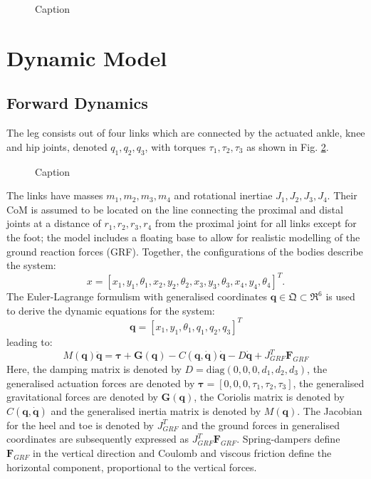 \documentclass[letterpaper, 10 pt, conference]{ieeeconf}  %
\begin{document}
\begin{figure}[b]
	\centering
	\caption{Caption}
	\label{fig:configurations}
\end{figure}

\section{Dynamic Model} \label{sec:dynamicModel}

\subsection{Forward Dynamics} 
The leg consists out of four links which are connected by the actuated ankle, knee and hip joints, denoted $q_1,q_2,q_3$, with torques $\tau_1,\tau_2,\tau_3$ as shown in Fig. \ref{fig:leg}. 
\begin{figure}[b]
	\centering
	\caption{Caption}
	\label{fig:leg}
\end{figure}
The links have masses $m_1,m_2,m_3,m_4$ and rotational inertiae $J_1,J_2,J_3,J_4$. Their CoM is assumed to be located on the line connecting the proximal and distal joints at a distance of $r_1,r_2,r_3,r_4$ from the proximal joint for all links except for the foot; the model includes a floating base to allow for realistic modelling of the ground reaction forces (GRF). Together, the configurations of the bodies describe the system:
 \begin{equation}
x = [x_1,y_1,\theta_1,x_2,y_2,\theta_2, x_3,y_3,\theta_3,x_4,y_4,\theta_4]^T. 
\end{equation}
The Euler-Lagrange formulism with generalised coordinates $\mathbf{q} \in \mathfrak{Q} \subset \mathfrak{R}^{6}$ is used to derive the dynamic equations for the system:
 \begin{equation}
\mathbf{q}=[x_1,y_1,\theta_1,q_1,q_2,q_3]^T \label{eq:q}
 \end{equation}
leading to:
 \begin{equation}
M(\mathbf{q})\mathbf{\ddot q} = \mathbf{\boldsymbol{\tau} + G(q)} - C\mathbf{(q,\dot q)\dot q -} D \mathbf{\dot q} + J_{GRF}^T \mathbf{F}_{GRF}  \label{eq:fwddyn}
 \end{equation}
Here, the damping matrix is denoted by $D = \text{diag} (0,0,0,d_1,d_2,d_3)$, the generalised actuation forces are denoted by $\boldsymbol{\tau} = [0,0,0,\tau_1,\tau_2,\tau_3]$, the generalised gravitational forces are denoted by $\mathbf{G(q)}$, the Coriolis matrix is denoted by $C\mathbf{(q, \dot q)}$ and the generalised inertia matrix is denoted by $M(\mathbf{q})$. The Jacobian for the heel and toe is denoted by $J_{GRF}^T$ and the ground forces in generalised coordinates are subsequently expressed as $J_{GRF}^T \mathbf{F}_{GRF}$. Spring-dampers define $\mathbf{F}_{GRF}$ in the vertical direction and Coulomb and viscous friction define the horizontal component, proportional to the vertical forces.
 
\end{document}
